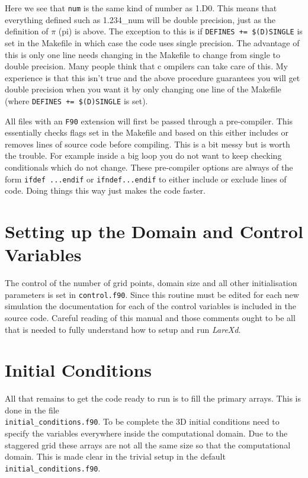 \documentclass[11pt]{article}
\begin{document}
Here we see that \texttt{num} is the same kind of number as 1.D0. This means that everything defined such as 1.234\_num 
will be double precision, just as the definition of $\pi$ (pi) is above. The exception to this is if 
\texttt{DEFINES += \$(D)SINGLE} is set in the Makefile in which case the code uses single precision. The advantage of 
this is only one line needs changing in the Makefile to change from single to double precision. Many people think that c
ompilers can take care of this. My experience is that this isn't true and the above procedure guarantees you will get 
double precision when you want it by only changing one line of the Makefile (where {\tt DEFINES += \$(D)SINGLE} is set).

All files with an \texttt{F90} extension will first be passed through a pre-compiler. This essentially checks flags set 
in the Makefile and based on this either includes or removes lines of source code before compiling. This is a bit messy 
but is worth the trouble. For example inside a big loop you do not want to keep checking conditionals which do not change. 
These pre-compiler options are always of the form \texttt{ifdef ...endif} or \texttt{ifndef...endif} to either include 
or exclude lines of code. Doing things this way just makes the code faster.

\section{Setting up the Domain and Control Variables}
The control of the number of grid points, domain size and all other initialisation parameters is set in \texttt{control.f90}. 
Since this routine must be edited for each new simulation the documentation for each of the control variables is 
included in the source code. Careful reading of this manual and those comments ought to be all that is needed to fully 
understand how to setup and run \textit{LareXd}.

\section{Initial Conditions}
All that remains to get the code ready to run is to fill the primary arrays. This is done in the file \\ 
\texttt{initial\_conditions.f90}. To be complete the 3D initial conditions need to specify the variables everywhere 
inside the computational domain. Due to the staggered grid these arrays are not all the same size so that the 
computational domain. This is made clear in the trivial setup in the default \texttt{initial\_conditions.f90}.
\end{document}
